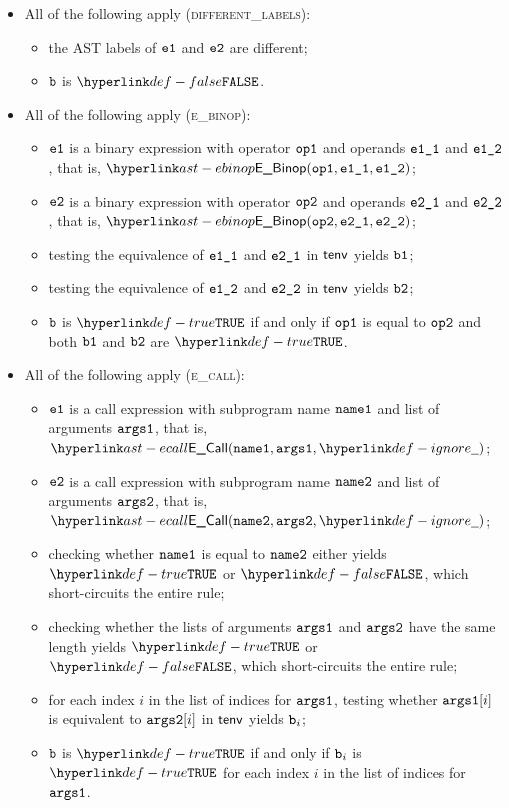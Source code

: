 \begin{itemize}
  \item All of the following apply (\textsc{different\_labels}):
  \begin{itemize}
    \item the AST labels of $\texttt{e1}$ and $\texttt{e2}$ are different;
    \item $\texttt{b}$ is $\False$.
  \end{itemize}

  \item All of the following apply (\textsc{e\_binop}):
  \begin{itemize}
    \item $\texttt{e1}$ is a binary expression with operator $\texttt{op1}$ and operands $\texttt{e1\_1}$ and $\texttt{e1\_2}$,
          that is, $\EBinop(\opone, \veoneone, \veonetwo)$;
    \item $\texttt{e2}$ is a binary expression with operator $\texttt{op2}$ and operands $\texttt{e2\_1}$ and $\texttt{e2\_2}$,
          that is, $\EBinop(\optwo, \vetwoone, \vetwotwo)$;
    \item testing the equivalence of $\texttt{e1\_1}$ and $\texttt{e2\_1}$ in $\textsf{tenv}$ yields $\texttt{b1}$\ProseOrTypeError;
    \item testing the equivalence of $\texttt{e1\_2}$ and $\texttt{e2\_2}$ in $\textsf{tenv}$ yields $\texttt{b2}$\ProseOrTypeError;
    \item $\texttt{b}$ is $\True$ if and only if $\texttt{op1}$ is equal to $\texttt{op2}$ and both $\texttt{b1}$ and $\texttt{b2}$ are $\True$.
  \end{itemize}

  \item All of the following apply (\textsc{e\_call}):
  \begin{itemize}
    \item $\texttt{e1}$ is a call expression with subprogram name $\texttt{name1}$ and list of arguments $\texttt{args1}$,
          that is, $\ECall(\nameone, \vargsone, \Ignore)$;
    \item $\texttt{e2}$ is a call expression with subprogram name $\texttt{name2}$ and list of arguments $\texttt{args2}$,
          that is, $\ECall(\nametwo, \vargstwo, \Ignore)$;
    \item checking whether $\texttt{name1}$ is equal to $\texttt{name2}$ either yields $\True$ or $\False$, which short-circuits the entire rule;
    \item checking whether the lists of arguments $\texttt{args1}$ and $\texttt{args2}$ have the same length yields
          $\True$ or $\False$, which short-circuits the entire rule;
    \item for each index $i$ in the list of indices for $\texttt{args1}$, testing whether $\texttt{args1}[i]$ is equivalent to $\texttt{args2}[i]$
          in $\textsf{tenv}$ yields $\texttt{b}_i$\ProseOrTypeError;
    \item $\texttt{b}$ is $\True$ if and only if $\texttt{b}_i$ is $\True$ for each index $i$ in the list of indices for $\texttt{args1}$.
  \end{itemize}


\end{itemize}
